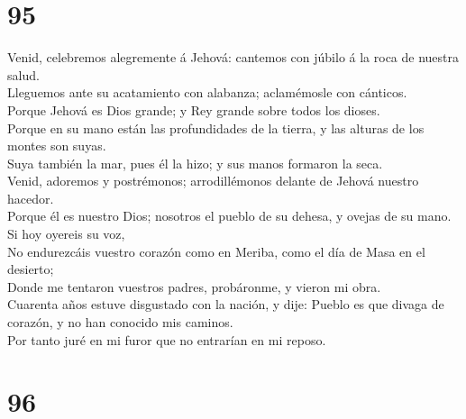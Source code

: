 \hypertarget{section-94}{%
\section{95}\label{section-94}}

 Venid, celebremos alegremente á Jehová: cantemos con júbilo
á la roca de nuestra salud.\\
 Lleguemos ante su acatamiento con alabanza; aclamémosle con
cánticos.\\
 Porque Jehová es Dios grande; y Rey grande sobre todos los
dioses.\\
 Porque en su mano están las profundidades de la tierra, y
las alturas de los montes son suyas.\\
 Suya también la mar, pues él la hizo; y sus manos formaron
la seca.\\
 Venid, adoremos y postrémonos; arrodillémonos delante de
Jehová nuestro hacedor.\\
 Porque él es nuestro Dios; nosotros el pueblo de su dehesa,
y ovejas de su mano. Si hoy oyereis su voz,\\
 No endurezcáis vuestro corazón como en Meriba, como el día
de Masa en el desierto;\\
 Donde me tentaron vuestros padres, probáronme, y vieron mi
obra.\\
 Cuarenta años estuve disgustado con la nación, y dije:
Pueblo es que divaga de corazón, y no han conocido mis caminos.\\
 Por tanto juré en mi furor que no entrarían en mi reposo.

\hypertarget{section-95}{%
\section{96}\label{section-95}}

